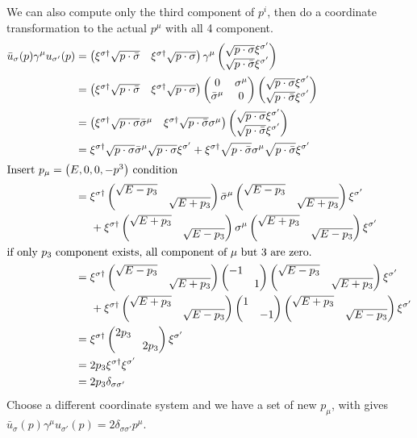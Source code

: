 \documentclass{article}
\newcommand{\gm}{\gamma^{\mu}}
\newcommand{\s}{\sigma}
\begin{document}
We can also compute only the third component of $p^{i}$, then do a coordinate transformation to the actual $p^{\mu}$ with all 4 component.
\begin{align*}
  \bar u_{\s}(p)\gm u_{\s'}(p)&=\pmqty{\xi^{\s\dagger}\sqrt{p\cdot\bar\sigma}&\xi^{\s\dagger}\sqrt{p\cdot\sigma}}\gm\pmqty{\sqrt{p\cdot\sigma}\xi^{\s'}\\\sqrt{p\cdot\bar\sigma}\xi^{\s'}}\\
  &=\pmqty{\xi^{\s\dagger}\sqrt{p\cdot\bar\sigma}&\xi^{\s\dagger}\sqrt{p\cdot\sigma}}\pmqty{0&\s^{\mu}\\\bar\s^{\mu}&0}\pmqty{\sqrt{p\cdot\sigma}\xi^{\s'}\\\sqrt{p\cdot\bar\sigma}\xi^{\s'}}\\
  &=\pmqty{\xi^{\s\dagger}\sqrt{p\cdot\sigma}\bar\s^{\mu}&\xi^{\s\dagger}\sqrt{p\cdot\bar\sigma}\s^{\mu}}\pmqty{\sqrt{p\cdot\sigma}\xi^{\s'}\\\sqrt{p\cdot\bar\sigma}\xi^{\s'}}\\
  &=\xi^{\s\dagger}\sqrt{p\cdot\sigma}\bar\s^{\mu}\sqrt{p\cdot\sigma}\xi^{\s'}+\xi^{\s\dagger}\sqrt{p\cdot\bar\sigma}\s^{\mu}\sqrt{p\cdot\bar\sigma}\xi^{\s'}\\
  \intertext{Insert $p_\mu=\pmqty{E,0,0,-p^3}$ condition}
  &=\xi^{\s\dagger}\pmqty{\sqrt{E-p_3}\\&\sqrt{E+p_3}}\bar\s^{\mu}\pmqty{\sqrt{E-p_3}\\&\sqrt{E+p_3}}\xi^{\s'}\\&\;\;\;\;\;+\xi^{\s\dagger}\pmqty{\sqrt{E+p_3}\\&\sqrt{E-p_3}}\s^{\mu}\pmqty{\sqrt{E+p_3}\\&\sqrt{E-p_3}}\xi^{\s'}\\
  \intertext{if only $p_3$ component exists, all component of $\mu$ but $3$ are zero.}
  &=\xi^{\s\dagger}\pmqty{\sqrt{E-p_3}\\&\sqrt{E+p_3}}\pmqty{-1\\&1}\pmqty{\sqrt{E-p_3}\\&\sqrt{E+p_3}}\xi^{\s'}\\&\;\;\;\;\;+\xi^{\s\dagger}\pmqty{\sqrt{E+p_3}\\&\sqrt{E-p_3}}\pmqty{1\\&-1}\pmqty{\sqrt{E+p_3}\\&\sqrt{E-p_3}}\xi^{\s'}\\
  &=\xi^{\s\dagger}\pmqty{2p_3\\&2p_3}\xi^{\s'}\\
  &=2p_3\xi^{\s\dagger}\xi^{\s'}\\
  &=2p_3\delta_{\s\s'}
\end{align*}
Choose a different coordinate system and we have a set of new $p_{\mu}$, with gives $\bar u_{\s}(p)\gm u_{\s'}(p)=2\delta_{\s\s'}p^{\mu}$.
\end{document}
